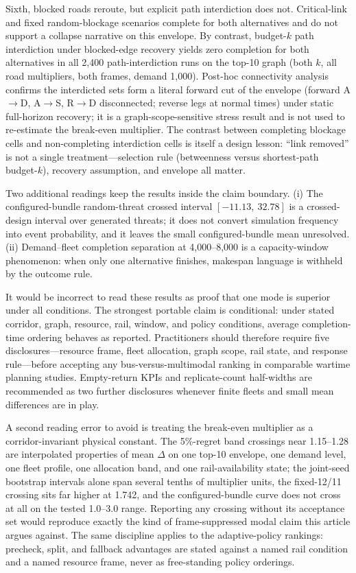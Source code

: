 \documentclass{ieeeaccess}
\begin{document}
Sixth, blocked roads reroute, but explicit path interdiction does not. Critical-link and fixed random-blockage scenarios complete for both alternatives and do not support a collapse narrative on this envelope. By contrast, budget-$k$ path interdiction under blocked-edge recovery yields zero completion for both alternatives in all 2{,}400 path-interdiction runs on the top-10 graph (both $k$, all road multipliers, both frames, demand 1{,}000). Post-hoc connectivity analysis confirms the interdicted sets form a literal forward cut of the envelope (forward A$\rightarrow$D, A$\rightarrow$S, R$\rightarrow$D disconnected; reverse legs at normal times) under static full-horizon recovery; it is a graph-scope-sensitive stress result and is not used to re-estimate the break-even multiplier. The contrast between completing blockage cells and non-completing interdiction cells is itself a design lesson: ``link removed'' is not a single treatment---selection rule (betweenness versus shortest-path budget-$k$), recovery assumption, and envelope all matter.

Two additional readings keep the results inside the claim boundary. (i) The configured-bundle random-threat crossed interval $[-11.13,\ 32.78]$ is a crossed-design interval over generated threats; it does not convert simulation frequency into event probability, and it leaves the small configured-bundle mean unresolved. (ii) Demand--fleet completion separation at 4{,}000--8{,}000 is a capacity-window phenomenon: when only one alternative finishes, makespan language is withheld by the outcome rule.

It would be incorrect to read these results as proof that one mode is superior under all conditions. The strongest portable claim is conditional: under stated corridor, graph, resource, rail, window, and policy conditions, average completion-time ordering behaves as reported. Practitioners should therefore require five disclosures---resource frame, fleet allocation, graph scope, rail state, and response rule---before accepting any bus-versus-multimodal ranking in comparable wartime planning studies. Empty-return KPIs and replicate-count half-widths are recommended as two further disclosures whenever finite fleets and small mean differences are in play.

A second reading error to avoid is treating the break-even multiplier as a corridor-invariant physical constant. The 5\%-regret band crossings near 1.15--1.28 are interpolated properties of mean $\Delta$ on one top-10 envelope, one demand level, one fleet profile, one allocation band, and one rail-availability state; the joint-seed bootstrap intervals alone span several tenths of multiplier units, the fixed-12/11 crossing sits far higher at 1.742, and the configured-bundle curve does not cross at all on the tested 1.0--3.0 range. Reporting any crossing without its acceptance set would reproduce exactly the kind of frame-suppressed modal claim this article argues against. The same discipline applies to the adaptive-policy rankings: precheck, split, and fallback advantages are stated against a named rail condition and a named resource frame, never as free-standing policy orderings.
\end{document}
